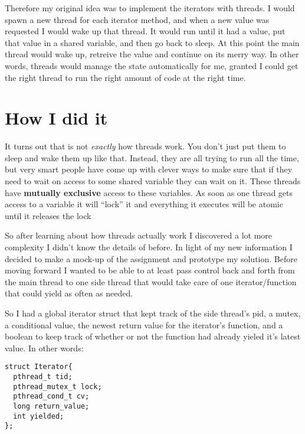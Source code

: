 \documentclass[12pt]{article}
\begin{document}
    Therefore my original idea was to implement the iterators with threads. I would spawn a new thread for each iterator method, and when a new value was requested I would wake up that thread. It would run until it had a value, put that value in a shared variable, and then go back to sleep. At this point the main thread would wake up, retreive the value and continue on its merry way. In other words, threads would manage the state automatically for me, granted I could get the right thread to run the right amount of code at the right time. 

  \section{How I did it}

    It turns out that is not \textit{exactly} how threads work. You don't just put them to sleep and wake them up like that. Instead, they are all trying to run all the time, but very smart people have come up with clever ways to make sure that if they need to wait on access to some shared variable they can wait on it. These threads have \textbf{mutually exclusive} access to these variables. As soon as one thread gets access to a variable it will ``lock'' it and everything it executes will be atomic until it releases the lock


    So after learning about how threads actually work I discovered a lot more complexity I didn't know the details of before. In light of my new information I decided to make a mock-up of the assignment and prototype my solution. Before moving forward I wanted to be able to at least pass control back and forth from the main thread to one side thread that would take care of one iterator/function that could yield as often as needed. 

    So I had a global iterator struct that kept track of the side thread's pid, a mutex, a conditional value, the newest return value for the iterator's function, and a boolean to keep track of whether or not the function had already yieled it's latest value. In other words:

    \begin{verbatim}
struct Iterator{
  pthread_t tid;
  pthread_mutex_t lock;
  pthread_cond_t cv;
  long return_value;
  int yielded;
};
    \end{verbatim}
\end{document}
